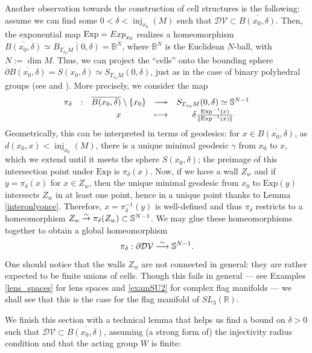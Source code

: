 \documentclass[11pt,twoside]{amsart}
\theoremstyle{plain}
\newcommand{\R}{{\mathbb R}}
\newcommand{\longto}{\longrightarrow}
\newcommand{\Sph}{\mathbb{S}}
\DeclareMathOperator\inj{inj}
\DeclareRobustCommand\longtwoheadrightarrow
     {\relbar\joinrel\twoheadrightarrow}
\begin{document}
Another observation towards the construction of cell structures is the following: assume we can find some $0<\delta<\inj_{x_0}(M)$ such that $\mathcal{DV}\subset \overline{B(x_0,\delta)}$. Then, the exponential map $\mathrm{Exp}={\rm Exp}_{x_0}$ realizes a homeomorphism $\overline{B(x_0,\delta)}\simeq\overline{B_{T_{x_0}M}(0,\delta)}=\mathbb{B}^{N}$, where $\mathbb{B}^{N}$ is the Euclidean $N$-ball, with $N:=\dim M$. Thus, we can project the ``cells'' onto the bounding sphere $\partial\overline{B(x_0,\delta)}=S(x_0,\delta)\simeq S_{T_{x_0}M}(0,\delta)$, just as in the case of binary polyhedral groups (see \cite{chirivi-spreafico} and \cite{chirivi-garnier-spreafico}). More precisely, we consider the map
\[\begin{array}{ccccc}
\pi_\delta & : & \overline{B(x_0,\delta)}\setminus\{x_0\} & \longtwoheadrightarrow & S_{T_{x_0}M}(0,\delta)\simeq\Sph^{N-1} \\ & & x & \longmapsto & \delta\frac{\mathrm{Exp}^{-1}(x)}{\|\mathrm{Exp}^{-1}(x)\|}\end{array}\]
Geometrically, this can be interpreted in terms of geodesics: for $x\in\overline{B(x_0,\delta)}$, as $d(x_0,x)<\inj_{x_0}(M)$, there is a unique minimal geodesic $\gamma$ from $x_0$ to $x$, which we extend until it meets the sphere $S(x_0,\delta)$; the preimage of this intersection point under $\mathrm{Exp}$ is $\pi_\delta(x)$. Now, if we have a wall $Z_w$ and if $y=\pi_\delta(x)$ for $x\in Z_w$, then the unique minimal geodesic from $x_0$ to $\mathrm{Exp}(y)$ intersects $Z_w$ in at least one point, hence in a unique point thanks to Lemma \ref{interonlyonce}. Therefore, $x=\pi_\delta^{-1}(y)$ is well-defined and thus $\pi_\delta$ restricts to a homeomorphism $Z_w \stackrel{\tiny{\sim}}\to \pi_\delta(Z_w)\subset\Sph^{N-1}$. We may glue these homeomorphisms together to obtain a global homeomorphism
\[\pi_\delta : \partial\mathcal{DV}\stackrel{\tiny{\sim}}\longto \Sph^{N-1}.\]
One should notice that the walls $Z_w$ are not connected in general: they are rather expected to be finite unions of cells. Though this fails in general --- see Examples \ref{lens_spaces} for lens spaces and \ref{examSU2} for complex flag manifolds --- we shall see that this is the case for the flag manifold of $SL_3(\R)$. %

We finish this section with a technical lemma that helps us find a bound on $\delta>0$ such that $\mathcal{DV}\subset \overline{B(x_0,\delta)}$, assuming (a strong form of) the injectivity radius condition and that the acting group $W$ is finite:
\end{document}

